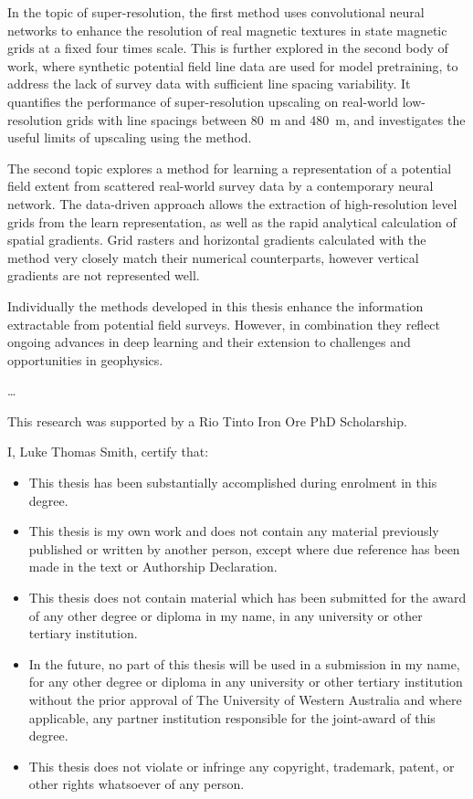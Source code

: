\documentclass[12pt,a4paper]{report} %
\begin{document}
In the topic of super-resolution, the first method uses convolutional neural networks to enhance the resolution of real magnetic textures in state magnetic grids at a fixed four times scale.
This is further explored in the second body of work, where synthetic potential field line data are used for model pretraining, to address the lack of survey data with sufficient line spacing variability.
It quantifies the performance of super-resolution upscaling on real-world low-resolution grids with line spacings between \SI{80}{\m} and \SI{480}{\m}, and investigates the useful limits of upscaling using the method.

The second topic explores a method for learning a representation of a potential field extent from scattered real-world survey data by a contemporary neural network.
The data-driven approach allows the extraction of high-resolution level grids from the learn representation, as well as the rapid analytical calculation of spatial gradients.
Grid rasters and horizontal gradients calculated with the method very closely match their numerical counterparts, however vertical gradients are not represented well.

Individually the methods developed in this thesis enhance the information extractable from potential field surveys.
However, in combination they reflect ongoing advances in deep learning and their extension to challenges and opportunities in geophysics.

\newpage{}
\dots{}

This research was supported by a Rio Tinto Iron Ore PhD Scholarship.

\newpage{}
\tableofcontents{}

\newpage{}
I, Luke Thomas Smith, certify that:
\begin{itemize}
    \item{}This thesis has been substantially accomplished during enrolment in this degree.
    \item{}This thesis is my own work and does not contain any material previously published or written by another person, except where due reference has been made in the text or Authorship Declaration.
    \item{}This thesis does not contain material which has been submitted for the award of any other degree or diploma in my name, in any university or other tertiary institution.
    \item{}In the future, no part of this thesis will be used in a submission in my name, for any other degree or diploma in any university or other tertiary institution without the prior approval of The University of Western Australia and where applicable, any partner institution responsible for the joint-award of this degree.
    \item{}This thesis does not violate or infringe any copyright, trademark, patent, or other rights whatsoever of any person.
\end{itemize}
\end{document}
